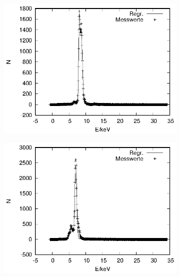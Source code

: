 \begin{figure}[!h]
\begin{subfigure}[h]{0.5\textwidth}
    \includegraphics{data/Massenanteil/probe_3.eps}
  \end{subfigure}%
  \begin{subfigure}[h]{0.5\textwidth}
    \centering
    \includegraphics{data/Massenanteil/probe_4.eps}
  \end{subfigure}
\end{figure}
